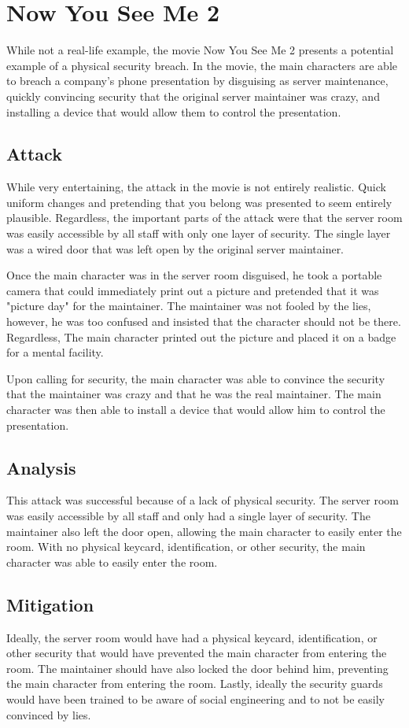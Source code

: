 \documentclass[acmsmall]{acmart}
\begin{document}
\section{Now You See Me 2}
While not a real-life example, the movie Now You See Me 2 \cite{NowYouSeeMe2} presents
a potential example of a physical security breach. In the movie, the main characters
are able to breach a company's phone presentation by disguising as server maintenance,
quickly convincing security that the original server maintainer was crazy, and
installing a device that would allow them to control the presentation.

\subsection{Attack}
While very entertaining, the attack in the movie is not entirely realistic. Quick uniform
changes and pretending that you belong was presented to seem entirely plausible. Regardless,
the important parts of the attack were that the server room was easily accessible by all staff
with only one layer of security. The single layer was a wired door that was left open
by the original server maintainer.

Once the main character was in the server room disguised, he took a portable camera that could
immediately print out a picture and pretended that it was "picture day" for the maintainer.
The maintainer was not fooled by the lies, however, he was too confused and insisted that the
character should not be there. Regardless, The main character printed out the picture and
placed it on a badge for a mental facility.

Upon calling for security, the main character was able to convince the security that the
maintainer was crazy and that he was the real maintainer. The main character was then able
to install a device that would allow him to control the presentation.

\subsection{Analysis}
This attack was successful because of a lack of physical security. The server room was
easily accessible by all staff and only had a single layer of security. The maintainer
also left the door open, allowing the main character to easily enter the room.
With no physical keycard, identification, or other security, the main character was
able to easily enter the room.

\subsection{Mitigation}
Ideally, the server room would have had a physical keycard, identification, or other
security that would have prevented the main character from entering the room. The
maintainer should have also locked the door behind him, preventing the main character
from entering the room. Lastly, ideally the security guards would have been trained
to be aware of social engineering and to not be easily convinced by lies.
\end{document}
